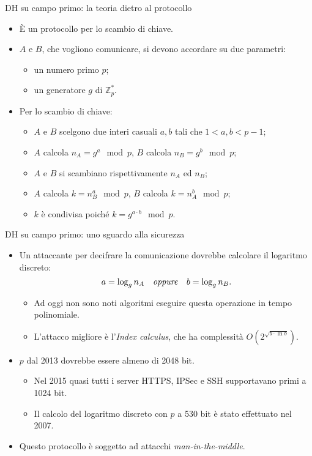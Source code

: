 \documentclass[11pt,svgnames,smaller,aspectratio=169,italian]{beamer}
\begin{document}
\begin{frame}{DH su campo primo: la teoria dietro al protocollo}
	\begin{itemize}
		\item È un protocollo per lo scambio di chiave.
		\item $A$ e $B$, che vogliono comunicare, si devono accordare su due parametri:
			\begin{itemize}
				\item un numero primo $p$;
				\item un generatore $g$ di $\mathds{Z}_{p}^{*}$.
			\end{itemize}
		\item Per lo scambio di chiave:
			\begin{itemize}
				\item $A$ e $B$ scelgono due interi casuali $a, b$ tali che $1 < a, b < p - 1$;
				\item $A$ calcola $n_{A} = g^{a} \mod p$, $B$ calcola $n_{B} = g^{b} \mod p$;
				\item $A$ e $B$ si scambiano rispettivamente $n_{A}$ ed $n_{B}$;
				\item $A$ calcola $k = n_{B}^{a} \mod p$, $B$ calcola $k = n_{A}^{b} \mod p$;
				\item $k$ è condivisa poiché $k = g^{a \cdot b} \mod p$.
			\end{itemize}
	\end{itemize}
\end{frame}

\begin{frame}{DH su campo primo: uno sguardo alla sicurezza}
	\begin{itemize}
		\item Un attaccante per decifrare la comunicazione dovrebbe calcolare il logaritmo discreto:
			\begin{equation*}
				a = \log_{g} n_{A}	\quad\text{\emph{oppure}}	\quad b = \log_{g} n_{B}.
			\end{equation*}
			\begin{itemize}
				\item Ad oggi non sono noti algoritmi eseguire questa operazione in tempo polinomiale.
				\item L'attacco migliore è l'\emph{Index calculus}, che ha complessità $O(2^{\sqrt{b \cdot \ln b}})$.
			\end{itemize}
		\item $p$ dal 2013 dovrebbe essere almeno di 2048 bit.
			\begin{itemize}
				\item Nel 2015 quasi tutti i server HTTPS, IPSec e SSH supportavano primi a 1024 bit.
				\item Il calcolo del logaritmo discreto con $p$ a 530 bit è stato effettuato nel 2007.
			\end{itemize}
		\item Questo protocollo è soggetto ad attacchi \emph{man-in-the-middle}.
	\end{itemize}
\end{frame}
\end{document}
